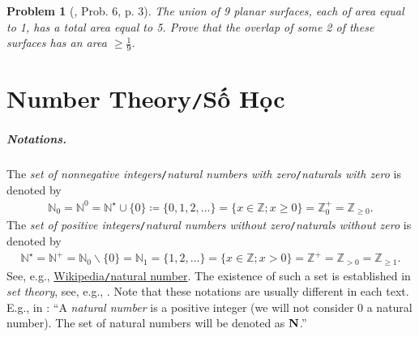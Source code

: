 \documentclass[oneside]{book}
\numberwithin{equation}{section}
\newtheorem{problem}{Problem}[section]
\begin{document}
\begin{problem}	[\cite{Gelca_Andreescu2017}, Prob. 6, p. 3]
	The union of 9 planar surfaces, each of area equal to 1, has a total area equal to 5. Prove that the overlap of some 2 of these surfaces has an area $\ge\frac{1}{9}$.
\end{problem}


\chapter{Number Theory\texttt{/}Số Học}

\paragraph{Notations.} The \textit{set of nonnegative integers}\texttt{/}\textit{natural numbers with zero}\texttt{/}\textit{naturals with zero} is denoted by
\begin{align*}
	\mathbb{N}_0 = \mathbb{N}^0 = \mathbb{N}^\star\cup\{0\}\coloneqq\{0,1,2,\ldots\} = \{x\in\mathbb{Z};x\ge 0\} = \mathbb{Z}_0^+ = \mathbb{Z}_{\ge 0}.
\end{align*}
The \textit{set of positive integers}\texttt{/}\textit{natural numbers without zero}\texttt{/}\textit{naturals without zero} is denoted by
\begin{align*}
	\mathbb{N}^\star = \mathbb{N}^+ = \mathbb{N}_0\backslash\{0\} = \mathbb{N}_1 = \{1,2,\ldots\} = \{x\in\mathbb{Z};x > 0\} = \mathbb{Z}^+ = \mathbb{Z}_{> 0} = \mathbb{Z}_{\ge 1}.
\end{align*}
See, e.g., \href{https://en.wikipedia.org/wiki/Natural_number}{Wikipedia\texttt{/}natural number}. The existence of such a set is established in \textit{set theory}, see, e.g., \cite{Halmos1960, Halmos1974, Kaplansky1972, Kaplansky1977}. Note that these notations are usually different in each text. E.g., in \cite[Chap. 2, p. 10]{Tao2006}: ``A \textit{natural number} is a positive integer (we will not consider 0 a natural number). The set of natural numbers will be denoted as ${\bf N}$.''
\end{document}
